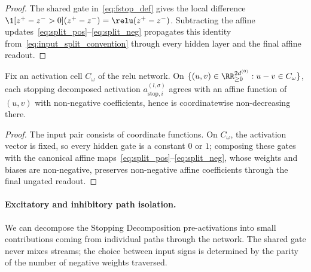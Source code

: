 \begin{proof}
The shared gate in~\eqref{eq:fstop_def} gives the local difference $\1[z^+-z^->0](z^+-z^-)=\relu(z^+-z^-)$. Subtracting the affine updates~\eqref{eq:split_pos}--\eqref{eq:split_neg} propagates this identity from~\eqref{eq:input_split_convention} through every hidden layer and the final affine readout.
\end{proof}

\begin{lemmaenv}\label{lem:stop_monotone}
Fix an activation cell $C_\omega$ of the \ac{relu} network. On $\{(u,v)\in\RR^{2d^{(0)}}_{\ge0}:u-v\in C_\omega\}$, each stopping decomposed activation $a_{\mathrm{stop},i}^{(l,\sigma)}$ agrees with an affine function of $(u,v)$ with non-negative coefficients, hence is coordinatewise non-decreasing there.\end{lemmaenv}

\begin{proof}
The input pair consists of coordinate functions. On $C_\omega$, the activation vector is fixed, so every hidden gate is a constant $0$ or $1$; composing these gates with the canonical affine maps~\eqref{eq:split_pos}--\eqref{eq:split_neg}, whose weights and biases are non-negative, preserves non-negative affine coefficients through the final ungated readout.
\end{proof}

\paragraph{Excitatory and inhibitory path isolation.}
We can decompose the Stopping Decomposition pre-activations into small contributions coming from individual paths through the network. The shared gate never mixes streams; the choice between input signs is determined by the parity of the number of negative weights traversed.

